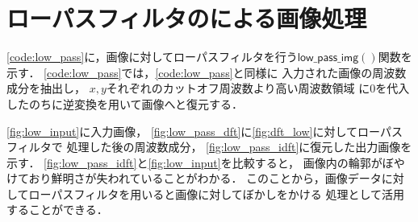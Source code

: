 \section{ローパスフィルタのによる画像処理}

\autoref{code:low_pass}に，画像に対してローパスフィルタを行う$\mathsf{low\_pass\_img}()$関数を示す．
\autoref{code:low_pass}では，\autoref{code:low_pass}と同様に
入力された画像の周波数成分を抽出し， $x, y$それぞれのカットオフ周波数より高い周波数領域
に0を代入したのちに逆変換を用いて画像へと復元する．


\autoref{fig:low_input}に入力画像，
\autoref{fig:low_pass_dft}に\autoref{fig:dft_low}に対してローパスフィルタで
処理した後の周波数成分，
\autoref{fig:low_pass_idft}に復元した出力画像を示す．
\autoref{fig:low_pass_idft}と\autoref{fig:low_input}を比較すると，
画像内の輪郭がぼやけており鮮明さが失われていることがわかる．
このことから，画像データに対してローパスフィルタを用いると画像に対してぼかしをかける
処理として活用することができる．

